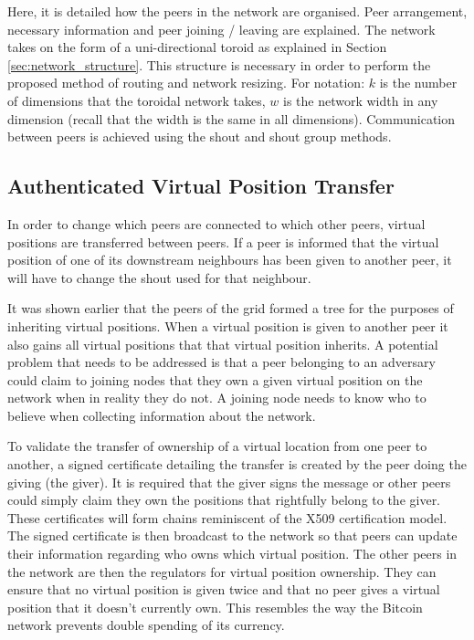 \documentclass[ %
                    author={Luke Murray},
                supervisor={Dr. Simon Hollis},
                     title={Shadow Peer-to-Peer Networks},
                  subtitle={},
                    degree={MEng},
                      year={2013} ]{thesis}
\begin{document}
Here, it is detailed how the peers in the network are organised. Peer arrangement, necessary information and peer joining / leaving are explained. The network takes on the form of a uni-directional toroid as explained in Section \ref{sec:network_structure}. This structure is necessary in order to perform the proposed method of routing and network resizing. For notation: $k$ is the number of dimensions that the toroidal network takes, $w$ is the network width in any dimension (recall that the width is the same in all dimensions). Communication between peers is achieved using the shout and shout group methods.

\subsection{Authenticated Virtual Position Transfer}

In order to change which peers are connected to which other peers, virtual positions are transferred between peers. If a peer is informed that the virtual position of one of its downstream neighbours has been given to another peer, it will have to change the shout used for that neighbour.

It was shown earlier that the peers of the grid formed a tree for the purposes of inheriting virtual positions. When a virtual position is given to another peer it also gains all virtual positions that that virtual position inherits. A potential problem that needs to be addressed is that a peer belonging to an adversary could claim to joining nodes that they own a given virtual position on the network when in reality they do not. A joining node needs to know who to believe when collecting information about the network.

To validate the transfer of ownership of a virtual location from one peer to another, a signed certificate detailing the transfer is created by the peer doing the giving (the giver). It is required that the giver signs the message or other peers could simply claim they own the positions that rightfully belong to the giver. These certificates will form chains reminiscent of the X509 certification model. The signed certificate is then broadcast to the network so that peers can update their information regarding who owns which virtual position. The other peers in the network are then the regulators for virtual position ownership. They can ensure that no virtual position is given twice and that no peer gives a virtual position that it doesn't currently own. This resembles the way the Bitcoin network prevents double spending of its currency.
\end{document}
